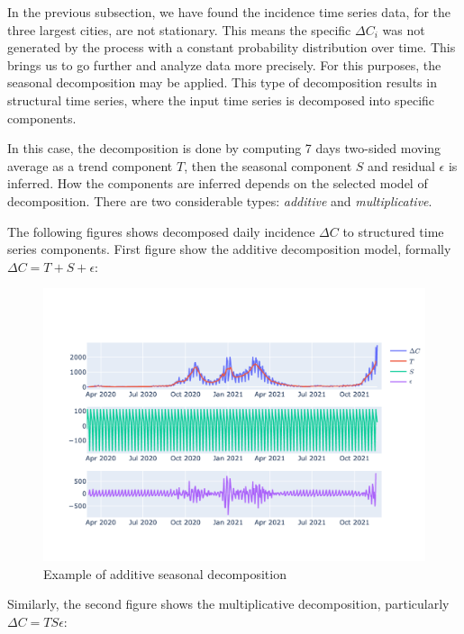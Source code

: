 \documentclass[
  digital, %
  table,   %
  twoside, %
  12pt,
  lof,     %
  lot,     %
]{fithesis3}
\begin{document}
In the previous subsection, we have found the incidence time 
series data, for the three largest cities, are not stationary. 
This means the specific $\Delta C_i$ was not generated by the 
process with a constant probability distribution over time. 
This brings us to go further and analyze data more precisely. 
For this purposes, the seasonal decomposition may be applied. 
This type of decomposition results in structural time series, 
where the input time series is decomposed into specific 
components.

In this case, the decomposition is done by computing 7 days 
two-sided moving average as a trend component $T$, then the 
seasonal component $S$ and residual $\epsilon$ is inferred. 
How the components are inferred depends on the selected model 
of decomposition. There are two considerable types: 
\textit{additive} and \textit{multiplicative}.

The following figures shows decomposed daily incidence 
$\Delta C$ to structured time series components. 
First figure show the additive decomposition model, 
formally $\Delta C = T + S + \epsilon$:

\begin{figure}[h]
  \begin{center}
    \includegraphics[width=\textwidth]{images/seasonal-decomposition-additive.png}
  \end{center}
  \caption{Example of additive seasonal decomposition}
  \label{fig:seasonal-decomposition-additive}
\end{figure}

Similarly, the second figure shows the multiplicative 
decomposition, particularly $\Delta C = T S \epsilon$:
\end{document}
